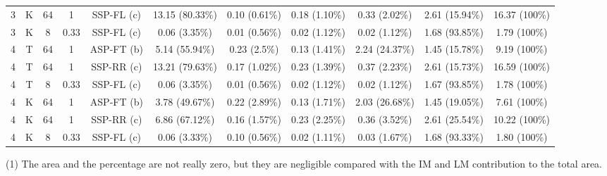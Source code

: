 \documentclass[10pt,twocolumn,journal]{IEEEtran}
\begin{document}
\begin{table*}[t!]
\begin{threeparttable}[t]
\begin{tabular}{|c|c|c|c|c|c|c|c|c|c|c|}
\rowcolor[gray]{0.8} 3   & K    & 64  &  1  & SSP-FL (c) & 13.15 (80.33\%) & 0.10 (0.61\%) & 0.18 (1.10\%) & 0.33 (2.02\%) & 2.61 (15.94\%) & 16.37 (100\%) \\
\rowcolor[gray]{0.7} 3   & K    & 8   & 0.33 & SSP-FL (c) & 0.06 (3.35\%) & 0.01 (0.56\%) & 0.02 (1.12\%) & 0.02 (1.12\%) & 1.68 (93.85\%) & 1.79 (100\%) \\
\hline
\rowcolor[gray]{0.9} 4   & T    & 64  & 1   & ASP-FT (b) &  5.14 (55.94\%) & 0.23 (2.5\%) & 0.13 (1.41\%) & 2.24 (24.37\%) & 1.45 (15.78\%) & 9.19 (100\%) \\
\rowcolor[gray]{0.8} 4   & T    & 64  & 1   & SSP-RR (c) &  13.21 (79.63\%) & 0.17 (1.02\%) & 0.23 (1.39\%) & 0.37 (2.23\%) & 2.61 (15.73\%) & 16.59 (100\%) \\
\rowcolor[gray]{0.7} 4   & T    & 8  & 0.33   & SSP-FL (c) & 0.06 (3.35\%) & 0.01 (0.56\%) & 0.02 (1.12\%) & 0.02 (1.12\%) & 1.67 (93.85\%) & 1.78 (100\%) \\
\rowcolor[gray]{0.9} 4   & K    & 64  & 1   & ASP-FT (b) & 3.78 (49.67\%) & 0.22 (2.89\%) & 0.13 (1.71\%) & 2.03 (26.68\%) & 1.45 (19.05\%) & 7.61 (100\%) \\
\rowcolor[gray]{0.8} 4   & K    & 64  & 1   & SSP-RR (c) & 6.86 (67.12\%) & 0.16 (1.57\%) & 0.23 (2.25\%) & 0.36 (3.52\%) & 2.61 (25.54\%) & 10.22 (100\%) \\
\rowcolor[gray]{0.7} 4   & K    & 8  & 0.33   & SSP-FL (c) & 0.06 (3.33\%) & 0.10 (0.56\%) & 0.02 (1.11\%) & 0.03 (1.67\%) & 1.68 (93.33\%) & 1.80 (100\%) \\
\hline
  \end{tabular}
  \begin{tablenotes}
  \item [(1)] The area and the percentage are not really zero, but they are negligible compared with the IM and LM 
contribution to the total area.
  \end{tablenotes}
  \end{threeparttable}
\end{table*}
\end{document}
